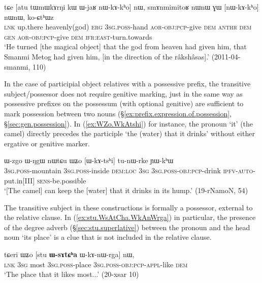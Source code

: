 \begin{exe}
\ex \label{ex:GW.kW.nWkAkho}
 \gll tɕe [atu tɯmɯkɤrŋi kɯ ɯ-jaʁ nɯ-kɤ-kʰo] nɯ, smɤnmimitoʁ nɯnɯ ɣɯ [nɯ-kɤ-kʰo] nɯnɯ, ko-ɕtʰɯz\\
\textsc{lnk} up.there heavenly(god) \textsc{erg} \textsc{3sg}.\textsc{poss}-hand \textsc{aor}-\textsc{obj}:\textsc{pcp}-give \textsc{dem}  \textsc{anthr} \textsc{dem} \textsc{gen} \textsc{aor}-\textsc{obj}:\textsc{pcp}-give \textsc{dem} \textsc{ifr}:\textsc{east}-turn.towards\\
\glt `He turned [the magical object] that the god from heaven had given him, that Smanmi Metog had given him, [in the direction of the râkshâsas].' (2011-04-smanmi, 110)
\end{exe}

In the case of participial object relatives with a possessive prefix, the transitive subject/possessor does not require genitive marking, just in the same way as possessive prefixes on the possessum (with optional genitive) are sufficient to mark possession between two nouns (§\ref{ex:prefix.expression.of.possession}, §\ref{sec:gen.possession}). In (\ref{ex:WZo.WkAtshi}) for instance, the pronoun  `it' (the camel) directly precedes the participle  `the (water) that it drinks' without either ergative or genitive marker.

\begin{exe}
\ex \label{ex:WZo.WkAtshi}
 \gll ɯ-zgo ɯ-ŋgɯ nɯtɕu ɯʑo [ɯ-kɤ-tsʰi] tu-nɯ-rke ɲɯ-kʰɯ \\
\textsc{3sg}.\textsc{poss}-mountain \textsc{3sg}.\textsc{poss}-inside \textsc{dem}:\textsc{loc} \textsc{3sg} \textsc{3sg}.\textsc{poss}-\textsc{obj}:\textsc{pcp}-drink \textsc{ipfv}-\textsc{auto}-put.in[III] \textsc{sens}-be.possible \\
\glt `[The camel] can keep the [water] that it drinks in its hump.' (19-rNamoN, 54)
\end{exe}

The transitive subject in these constructions is formally a possessor, external to the relative clause. In (\ref{ex:stu.WsAtCha.WkAnWrga}) in particular, the presence of the degree adverb  (§\ref{sec:stu.superlative}) between the pronoun  and the head noun  `its place' is a clue that  is not included in the relative clause.

\begin{exe}
\ex \label{ex:stu.WsAtCha.WkAnWrga}
\gll  tɕeri ɯʑo [stu \textbf{ɯ-sɤtɕʰa} ɯ-kɤ-nɯ-rga] nɯ, \\
\textsc{lnk} \textsc{3sg} most \textsc{3sg}.\textsc{poss}-place \textsc{3sg}.\textsc{poss}-\textsc{obj}:\textsc{pcp}-\textsc{appl}-like \textsc{dem} \\
\glt `The place that it likes most...' (20-xsar 10)
\end{exe}

